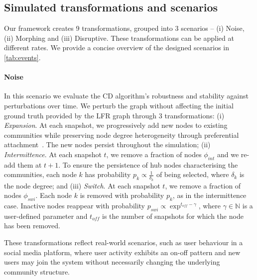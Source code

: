 \documentclass[letterpaper]{article}
\begin{document}
\subsection{Simulated transformations and scenarios}
\label{ss:scenarios}
Our framework creates 9 transformations, grouped into 
 3 scenarios -- \ie (i) Noise, (ii) Morphing and (iii) Disruptive. These transformations can be applied at different rates. We provide a concise overview of the designed scenarios in \cref{tab:events}.

\paragraph*{Noise} In this scenario we evaluate the CD algorithm's robustness and stability against perturbations over time. 
We perturb the graph without affecting the initial ground truth provided by the LFR graph through 3 transformations: (i) \emph{Expansion}. At each snapshot, we progressively add new nodes to existing communities while preserving node degree heterogeneity through preferential attachment~\cite{Baraba_si_1999}. The new nodes persist throughout the simulation; (ii) \emph{Intermittence}.
At each snapshot $t$, we remove a fraction of nodes $\phi_{int}$ and we re-add them at $t+1$. To ensure the persistence of hub nodes characterising the communities, each node $k$ has probability $p_{k} \propto \frac{1}{\delta_k}$ of being selected, where $\delta_k$ is the node degree; and (iii) \emph{Switch}. At each snapshot $t$, we remove a fraction of nodes $\phi_{swi}$. Each node $k$ is removed with probability $p_{k}$, as in the intermittence case. Inactive nodes reappear with probability $p_{swi} \propto \exp^{t_{off} -\gamma }$, where $\gamma \in \mathbb{N}$ is a user-defined parameter and $t_{off}$ is the number of snapshots for which the node has been removed.

These transformations reflect real-world scenarios, such as user behaviour in a social media platform, where user activity exhibits an on-off pattern and new users may join the system without necessarily changing the underlying community structure.
\end{document}

